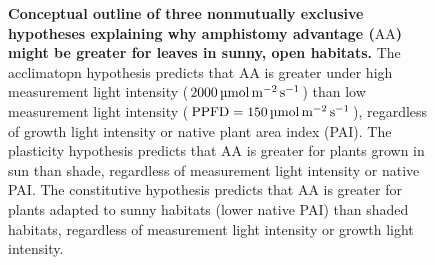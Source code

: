 \documentclass[
  letterpaper,
  DIV=11,
  numbers=noendperiod]{scrartcl}
\newcommand{\aax}{$\mathrm{AA}$}
\newcommand{\ppfdequals}[1]{$\mathrm{PPFD} = \qty{#1}{\micro\mol\raiseto{-2}\meter\raiseto{-1}\second}$}
\newcommand{\ppfdqty}[1]{$\qty{#1}{\micro\mol\raiseto{-2}\meter\raiseto{-1}\second}$}
\begin{document}
\begin{figure}


\caption{\label{fig-concept}\textbf{Conceptual outline of three nonmutually exclusive hypotheses explaining why amphistomy advantage (\aax{}) might be greater for leaves in sunny, open habitats.}
The acclimatopn hypothesis predicts that \aax{} is greater under high
measurement light intensity (\ppfdqty{2000}) than low measurement light
intensity (\ppfdequals{150}), regardless of growth light intensity or
native plant area index (PAI). The plasticity hypothesis predicts that
\aax{} is greater for plants grown in sun than shade, regardless of
measurement light intensity or native PAI. The constitutive hypothesis
predicts that \aax{} is greater for plants adapted to sunny habitats
(lower native PAI) than shaded habitats, regardless of measurement light
intensity or growth light intensity.}

\end{figure}%
\end{document}

